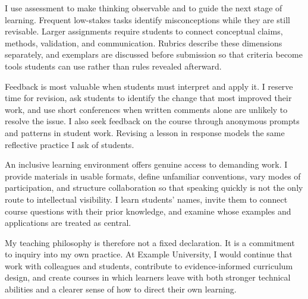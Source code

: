 \documentclass[type=teaching-philosophy]{careerdossier-statement}
\begin{document}

I use assessment to make thinking observable and to guide the next stage of
learning. Frequent low-stakes tasks identify misconceptions while they are
still revisable. Larger assignments require students to connect conceptual
claims, methods, validation, and communication. Rubrics describe these
dimensions separately, and exemplars are discussed before submission so that
criteria become tools students can use rather than rules revealed afterward.

Feedback is most valuable when students must interpret and apply it. I reserve
time for revision, ask students to identify the change that most improved their
work, and use short conferences when written comments alone are unlikely to
resolve the issue. I also seek feedback on the course through anonymous prompts
and patterns in student work. Revising a lesson in response models the same
reflective practice I ask of students.


An inclusive learning environment offers genuine access to demanding work. I
provide materials in usable formats, define unfamiliar conventions, vary modes
of participation, and structure collaboration so that speaking quickly is not
the only route to intellectual visibility. I learn students' names, invite them
to connect course questions with their prior knowledge, and examine whose
examples and applications are treated as central.

My teaching philosophy is therefore not a fixed declaration. It is a commitment
to inquiry into my own practice. At Example University, I would continue that
work with colleagues and students, contribute to evidence-informed curriculum
design, and create courses in which learners leave with both stronger technical
abilities and a clearer sense of how to direct their own learning.
\end{document}
